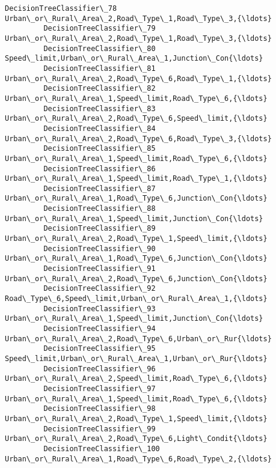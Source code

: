 \documentclass[11pt]{article}
\begin{document}
\begin{Verbatim}[commandchars=\\\{\}]
         DecisionTreeClassifier\_78   Urban\_or\_Rural\_Area\_2,Road\_Type\_1,Road\_Type\_3,{\ldots}   
         DecisionTreeClassifier\_79   Urban\_or\_Rural\_Area\_2,Road\_Type\_1,Road\_Type\_3,{\ldots}   
         DecisionTreeClassifier\_80   Speed\_limit,Urban\_or\_Rural\_Area\_1,Junction\_Con{\ldots}   
         DecisionTreeClassifier\_81   Urban\_or\_Rural\_Area\_2,Road\_Type\_6,Road\_Type\_1,{\ldots}   
         DecisionTreeClassifier\_82   Urban\_or\_Rural\_Area\_1,Speed\_limit,Road\_Type\_6,{\ldots}   
         DecisionTreeClassifier\_83   Urban\_or\_Rural\_Area\_2,Road\_Type\_6,Speed\_limit,{\ldots}   
         DecisionTreeClassifier\_84   Urban\_or\_Rural\_Area\_2,Road\_Type\_6,Road\_Type\_3,{\ldots}   
         DecisionTreeClassifier\_85   Urban\_or\_Rural\_Area\_1,Speed\_limit,Road\_Type\_6,{\ldots}   
         DecisionTreeClassifier\_86   Urban\_or\_Rural\_Area\_1,Speed\_limit,Road\_Type\_1,{\ldots}   
         DecisionTreeClassifier\_87   Urban\_or\_Rural\_Area\_1,Road\_Type\_6,Junction\_Con{\ldots}   
         DecisionTreeClassifier\_88   Urban\_or\_Rural\_Area\_1,Speed\_limit,Junction\_Con{\ldots}   
         DecisionTreeClassifier\_89   Urban\_or\_Rural\_Area\_2,Road\_Type\_1,Speed\_limit,{\ldots}   
         DecisionTreeClassifier\_90   Urban\_or\_Rural\_Area\_1,Road\_Type\_6,Junction\_Con{\ldots}   
         DecisionTreeClassifier\_91   Urban\_or\_Rural\_Area\_2,Road\_Type\_6,Junction\_Con{\ldots}   
         DecisionTreeClassifier\_92   Road\_Type\_6,Speed\_limit,Urban\_or\_Rural\_Area\_1,{\ldots}   
         DecisionTreeClassifier\_93   Urban\_or\_Rural\_Area\_1,Speed\_limit,Junction\_Con{\ldots}   
         DecisionTreeClassifier\_94   Urban\_or\_Rural\_Area\_2,Road\_Type\_6,Urban\_or\_Rur{\ldots}   
         DecisionTreeClassifier\_95   Speed\_limit,Urban\_or\_Rural\_Area\_1,Urban\_or\_Rur{\ldots}   
         DecisionTreeClassifier\_96   Urban\_or\_Rural\_Area\_2,Speed\_limit,Road\_Type\_6,{\ldots}   
         DecisionTreeClassifier\_97   Urban\_or\_Rural\_Area\_1,Speed\_limit,Road\_Type\_6,{\ldots}   
         DecisionTreeClassifier\_98   Urban\_or\_Rural\_Area\_2,Road\_Type\_1,Speed\_limit,{\ldots}   
         DecisionTreeClassifier\_99   Urban\_or\_Rural\_Area\_2,Road\_Type\_6,Light\_Condit{\ldots}   
         DecisionTreeClassifier\_100  Urban\_or\_Rural\_Area\_1,Road\_Type\_6,Road\_Type\_2,{\ldots}   
         

\end{Verbatim}
\end{document}

